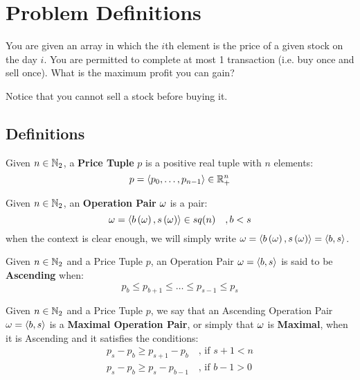 \section{Problem Definitions}

You are given an array in which the $i$th element is the price of a given stock on the day $i$. You are permitted to complete at most 1 transaction (i.e. buy once and sell once). What is the maximum profit you can gain?

Notice that you cannot sell a stock before buying it.

\subsection{Definitions}

\begin{defn}
    \label{def:price}
    Given $n \in \mathbb{N}_{2}$, a \textbf{Price Tuple} $p$ is a positive real tuple with $n$ elements:
    \begin{equation}
        p = \langle p_{0}, \dots, p_{n-1} \rangle \in \mathbb{R}^n_+
    \end{equation}
\end{defn}

\begin{defn}
    \label{def:op-pair}
    Given $n \in \mathbb{N}_{2}$, an \textbf{Operation Pair} $\omega$ is a pair:
    \begin{equation}
        \omega = \left\langle b\left( \omega \right), s\left( \omega \right) \right\rangle \in sq({n})
        \quad ,
        b < s
    \end{equation}
    when the context is clear enough, we will simply write $\omega = \left\langle b\left( \omega \right), s\left( \omega \right) \right\rangle = \left\langle b, s \right\rangle$.
\end{defn}

\begin{defn}
    Given $n \in \mathbb{N}_{2}$ and a Price Tuple $p$, an Operation Pair $\omega = \left\langle b, s \right\rangle$ is said to be \textbf{Ascending} when:
    \begin{equation}
        p_{b} \leqslant p_{b+1} \leqslant \dots \leqslant p_{s-1} \leqslant p_{s}
    \end{equation}
\end{defn}

\begin{defn}
    \label{def:max-op-pair}
    Given $n \in \mathbb{N}_{2}$ and a Price Tuple $p$, we say that an Ascending Operation Pair $\omega = \left\langle b, s \right\rangle$ is a \textbf{Maximal Operation Pair}, or simply that $\omega$ is \textbf{Maximal}, when it is Ascending and it satisfies the conditions:
    \begin{align}
        p_s - p_b \geqslant p_{s+1} - p_b \quad \mbox{, if } s+1 < n\\
        p_s - p_b \geqslant p_s - p_{b-1} \quad \mbox{, if } b-1 > 0
    \end{align}
\end{defn}

